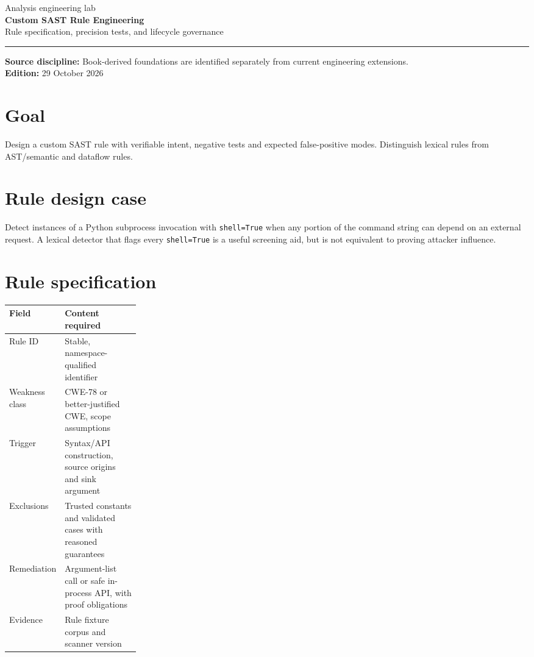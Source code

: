 \documentclass[10pt,letterpaper]{article}
\begin{document}
\hypersetup{pageanchor=false}%
\begin{titlepage}
\vspace*{1.0in}
{\color{bluegray}\Large Analysis engineering lab}\\[1.0em]
{\color{navy}\Huge\bfseries Custom SAST Rule Engineering}\\[0.7em]
{\Large Rule specification, precision tests, and lifecycle governance}\\[2.0em]
\rule{\linewidth}{1.0pt}
\vfill
\textbf{Source discipline:} Book-derived foundations are identified separately from current engineering extensions.\\
\textbf{Edition:} 29 October 2026
\end{titlepage}\hypersetup{pageanchor=true}
\tableofcontents
\clearpage
\section{Goal}
Design a custom SAST rule with verifiable intent, negative tests and expected false-positive modes. Distinguish lexical rules from AST/semantic and dataflow rules.
\section{Rule design case}
Detect instances of a Python subprocess invocation with \texttt{shell=True} when any portion of the command string can depend on an external request. A lexical detector that flags every \texttt{shell=True} is a useful screening aid, but is not equivalent to proving attacker influence.
\section{Rule specification}
\begin{tabularx}{\linewidth}{@{}p{0.25\linewidth}Y@{}}\toprule
Field & Content required\\\midrule
Rule ID & Stable, namespace-qualified identifier\\
Weakness class & CWE-78 or better-justified CWE, scope assumptions\\
Trigger & Syntax/API construction, source origins and sink argument\\
Exclusions & Trusted constants and validated cases with reasoned guarantees\\
Remediation & Argument-list call or safe in-process API, with proof obligations\\
Evidence & Rule fixture corpus and scanner version\\\bottomrule
\end{tabularx}
\end{document}
